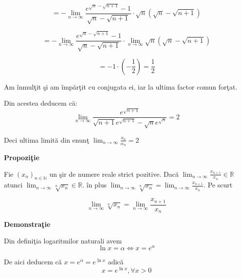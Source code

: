 \documentclass[a4paper,12pt,oneside]{report}
\begin{document}
\begin{enumerate}
\begin{displaymath}
  = - \lim_{n \to \infty } \frac{e^{\sqrt{n}- \sqrt{n+1}}-1}{\sqrt{n}- \sqrt{n+1}} \cdot \sqrt{n}\left ( \sqrt{n}-\sqrt{n+1} \right )
\end{displaymath}

\begin{displaymath}
  = -\lim_{n \to \infty } \frac{e^{\sqrt{n}- \sqrt{n+1}}-1}{\sqrt{n}- \sqrt{n+1}} \cdot \lim_{n \to \infty }\sqrt{n}\left ( \sqrt{n} -\sqrt{n+1}\right )
\end{displaymath}

\begin{displaymath}
  = -1 \cdot \left ( -\frac{1}{2} \right ) =\frac{1}{2}
\end{displaymath}

Am \^ inmul\c tit \c si am \^ imp\u ar\c tit cu conjugata ei, iar la ultima factor comun for\c tat. 

Din acestea deducem c\u a:
\begin{displaymath}
  \lim_{n \to \infty }\frac{e^{\sqrt{n+1}}}{\sqrt{n+1}e^{\sqrt{n+1}}-\sqrt{n}e^{\sqrt{n}}} = 2
\end{displaymath}


Deci ultima limit\u a din enun\c t \(\lim_{n \to \infty } \frac{x_{n}}{\alpha _{n}} = 2\)
\end{enumerate}

\textbf{Propozi\c tie} 

Fie \(\left ( x_{n} \right )_{n\in \mathbb{N}}\) un \c sir de numere reale strict pozitive. Dac\u a \(\lim_{n \to \infty }\frac{x_{n+1}}{x_{n}}\in \mathbb{R}\) atunci \(\lim_{n \to \infty } \sqrt[n]{x_{n}}\in \mathbb{R}\). \^ in plus \(\lim_{n \to \infty } \sqrt[n]{x_{n}} = \lim_{n \to \infty }\frac{x_{n+1}}{x_{n}}\). 
Pe scurt 

\begin{displaymath}
  \lim_{n \to \infty } \sqrt[n]{x_{n}} = \lim_{n \to \infty }\frac{x_{n+1}}{x_{n}}
\end{displaymath}



\textbf{Demonstra\c tie} 

Din defini\c tia logaritmilor naturali avem 
\begin{displaymath}
  \ln x = \alpha  \Leftrightarrow x = e^{\alpha }
\end{displaymath}

De aici deducem c\u a \(x = e^{\alpha } = e^{\ln x}\) adic\u a 
\begin{displaymath}
  x = e^{\ln x}, \forall x> 0
\end{displaymath}
\end{document}
